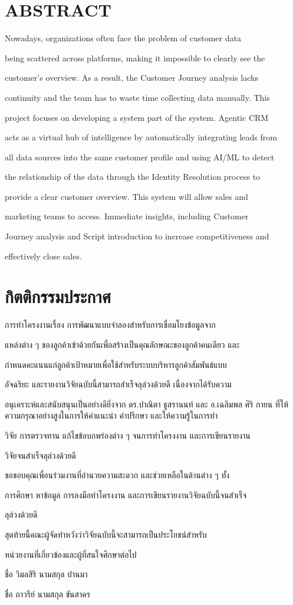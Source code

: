 \documentclass[12pt,a4paper]{report}
\begin{document}
\section*{ABSTRACT}
Nowadays, organizations often face the problem of customer data\par
being scattered across platforms, making it impossible to clearly see the\par
customer's overview. As a result, the Customer Journey analysis lacks\par
continuity and the team has to waste time collecting data manually. This\par
project focuses on developing a system part of the system. Agentic CRM\par
acts as a virtual hub of intelligence by automatically integrating leads from\par
all data sources into the same customer profile and using AI/ML to detect\par
the relationship of the data through the Identity Resolution process to\par
provide a clear customer overview. This system will allow sales and\par
marketing teams to access. Immediate insights, including Customer\par
Journey analysis and Script introduction to increase competitiveness and\par
effectively close sales.\par
\clearpage
\section*{กิตติกรรมประกาศ}
การทําโครงงานเรื่อง การพัฒนาแบบจำลองสำหรับการเชื่อมโยงข้อมูลจาก\par
แหล่งต่าง ๆ ของลูกค้าเข้าด้วยกันเพื่อสร้างเป็นคุณลักษณะของลูกค้าคนเดียว และ\par
กำหนดคะแนนแก่ลูกค้าเป้าหมายเพื่อใช้สำหรับระบบบริหารลูกค้าสัมพันธ์แบบ\par
อัจฉริยะ และรายงานวิจัยฉบับนี้สามารถสําเร็จลุล่วงด้วยดี เนื่องจากได้รับความ\par
อนุเคราะห์และสนับสนุนเป็นอย่างดียิ่งจาก ดร.ปาณิตา ธูสรานนท์ และ อ.เฉลิมพล ศิริ กายน ที่ให้ความกรุณาอย่างสูงในการให้คําแนะนํา คําปรึกษา และให้ความรู้ในการทํา\par
วิจัย การตรวจทาน แก้ไขข้อบกพร่องต่าง ๆ จนการทําโครงงาน และการเขียนรายงาน\par
วิจัยจนสําเร็จลุล่วงด้วยดี\par
ขอขอบคุณเพื่อนร่วมงานที่อํานวยความสะดวก และช่วยเหลือในด้านต่าง ๆ ทั้ง\par
การศึกษา หาข้อมูล การลงมือทําโครงงาน และการเขียนรายงานวิจัยฉบับนี้จนสําเร็จ\par
ลุล่วงด้วยดี\par
สุดท้ายนี้คณะผู้จัดทําหวังว่าวิจัยฉบับนี้จะสามารถเป็นประโยชน์สําหรับ\par
หน่วยงานที่เกี่ยวข้องและผู้ที่สนใจศึกษาต่อไป\par
ชื่อ วิมลสิริ นามสกุล ปานมา\par
ชื่อ ถาวรีย์ นามสกุล ขันสาคร\par
\clearpage
\end{document}
